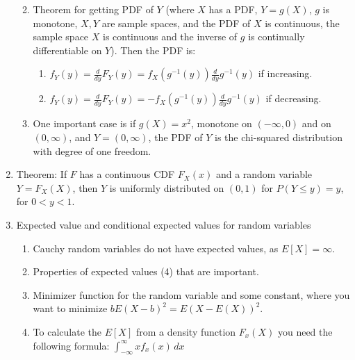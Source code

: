 \documentclass{article}
\begin{document}
\begin{enumerate}
\begin{enumerate}
\begin{enumerate}
        \end{enumerate}
        \item Theorem for getting PDF of \( Y \) (where \( X \) has a PDF, \( Y = g(X) \), \( g \) is monotone, \( X,Y \) are sample spaces, and the PDF of \( X \) is continuous, the sample space \( X \) is continuous and the inverse of \( g \) is continually differentiable on \( Y \)). Then the PDF is:
        \begin{enumerate}
            \item \( f_Y(y) = \frac{d}{dy} F_Y(y) = f_X(g^{-1}(y)) \frac{d}{dy} g^{-1}(y) \) if increasing.
            \item \( f_Y(y) = \frac{d}{dy} F_Y(y) = -f_X(g^{-1}(y)) \frac{d}{dy} g^{-1}(y) \) if decreasing.
        \end{enumerate}
        \item One important case is if \( g(X) = x^2 \), monotone on \((- \infty, 0)\) and on \((0, \infty)\), and \( Y = (0, \infty) \), the PDF of \( Y \) is the chi-squared distribution with degree of one freedom.
    \end{enumerate}

    \item Theorem: If \( F \) has a continuous CDF \( F_X(x) \) and a random variable \( Y = F_X(X) \), then \( Y \) is uniformly distributed on \((0,1)\) for  \( P(Y \leq y) = y \), for \( 0 < y < 1 \).

    \item Expected value and conditional expected values for random variables
    \begin{enumerate}
        \item Cauchy random variables do not have expected values, as \( E[X] = \infty \).
        \item Properties of expected values (4) that are important.
        \item Minimizer function for the random variable and some constant, where you want to minimize \( b E(X-b)^2 = E(X - E(X))^2 \).
        \item To calculate the $E[X]$ from a density function $F_x(X)$ you need the following formula: $ \int_{-\infty}^{\infty} x f_x(x) \, dx $

    \end{enumerate}


\end{enumerate}
\end{document}
